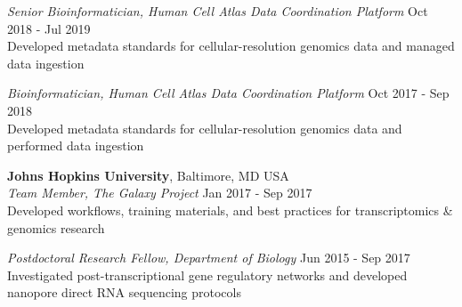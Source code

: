 \documentclass[margin,line]{res}
\begin{document}
\begin{resume}
{\em Senior Bioinformatician, Human Cell Atlas Data Coordination Platform} \hfill {Oct 2018 - Jul 2019}\\
Developed metadata standards for cellular-resolution genomics data and managed data ingestion

{\em Bioinformatician, Human Cell Atlas Data Coordination Platform} \hfill {Oct 2017 - Sep 2018}\\
Developed metadata standards for cellular-resolution genomics data and performed data ingestion

{\bf Johns Hopkins University}, Baltimore, MD USA\\
{\em Team Member, The Galaxy Project} \hfill {Jan 2017 - Sep 2017}\\
Developed workflows, training materials, and best practices for transcriptomics \& genomics research

{\em Postdoctoral Research Fellow, Department of Biology} \hfill {Jun 2015 - Sep 2017}\\
Investigated post-transcriptional gene regulatory networks and developed nanopore direct RNA sequencing protocols\\





\end{resume}
\end{document}

